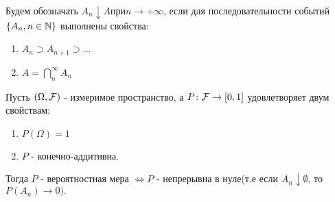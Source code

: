 \begin{definition}
	Будем обозначать $A_n \downarrow A при n \to +\infty $, 
	если для последовательности событий $\left\{ A_n, n \in \mathbb{N} \right\}$ выполнены свойства: 

	\begin{enumerate}
		\item $A_n \supset A_{n+1} \supset \ldots$
		\item $A = \bigcap\limits_{n}^{\infty} A_n$
	\end{enumerate}
\end{definition}

\begin{theorem}
	Пусть $(\Omega, \mathcal{F})$ - измеримое пространство, 
	а $P\colon \mathcal{F} \rightarrow [0, 1]$ удовлетворяет двум свойствам:
	\begin{enumerate}
		\item $P(\Omega) = 1$
		\item $P$ - конечно-аддитивна. 
	\end{enumerate}
	Тогда $P$ - вероятностная мера $\Leftrightarrow P$ - непрерывна в нуле(т.е если $A_n  \downarrow \emptyset$, то $P(A_n) \rightarrow 0).$
\end{theorem}

